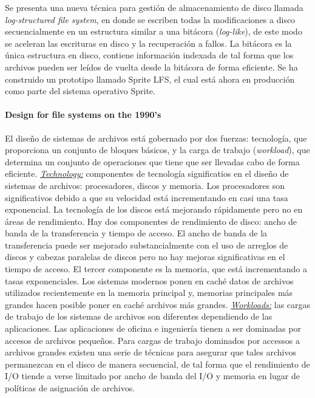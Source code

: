 Se presenta una nueva técnica para gestión de almacenamiento de disco llamada \emph{log-structured file system}, en donde se escriben todas la modificaciones a disco secuencialmente en un estructura similar a una bitácora (\emph{log-like}), de este modo se aceleran las escrituras en disco y la recuperación a fallos. La bitácora es la única estructura en disco, contiene información indexada de tal forma que los archivos pueden ser leídos de vuelta desde la bitácora de forma eficiente. Se ha construido un prototipo llamado Sprite LFS, el cual está  ahora en producción como parte del sistema operativo Sprite.

\paragraph{\textnormal{\textbf{Design for file systems on the 1990's}}}
El diseño de sistemas de archivos está gobernado por dos fuerzas: tecnología, que proporciona un conjunto de bloques básicos, y la carga de trabajo (\emph{workload}), que determina un conjunto de operaciones que tiene que ser llevadas cabo de forma eficiente. \underline{\emph{Technology:}} componentes de tecnología significatios en el diseño de sistemas de archivos: procesadores, discos y memoria. Los procesadores son significativos debido a que su velocidad está incrementando en casi una tasa exponencial. La tecnología de los discos está mejorando rápidamente pero no en áreas de rendimiento. Hay dos componentes de rendimiento de disco: ancho de banda de la transferencia y tiempo de acceso. El ancho de banda de la transferencia puede ser mejorado substancialmente con el uso de arreglos de discos y cabezas paralelas de discos pero no hay mejoras significativas en el tiempo de acceso. El tercer componente es la memoria, que está incrementando a tasas exponenciales. Los sistemas modernos ponen en caché datos de archivos utilizados recientemente en la memoria principal y, memorias principales más grandes hacen posible poner en caché archivos más grandes. \underline{\emph{Workloads:}} las cargas de trabajo de los sistemas de archivos son diferentes dependiendo de las aplicaciones. Las aplicaciones de oficina e ingeniería tienen a ser dominadas por accesos de archivos pequeños. Para cargas de trabajo dominados por accessos a archivos grandes existen una serie de técnicas para asegurar que tales archivos permanezcan en el disco de manera secuencial, de tal forma que el rendimiento de I/O tiende a verse limitado por ancho de banda del I/O y memoria en lugar de políticas de asignación de archivos. 

